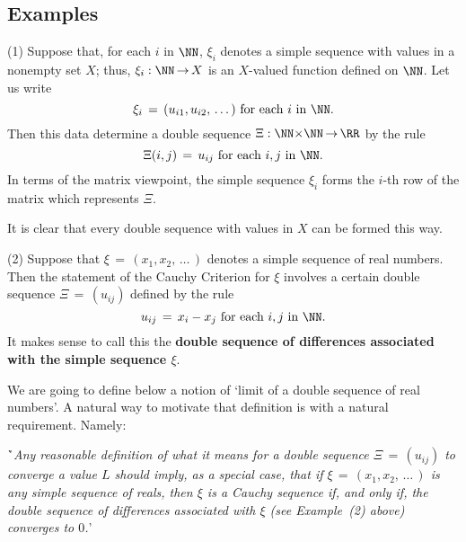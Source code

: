 {\V
\V


            \subsection{\small{\bf Examples}}
            \label{ExampC100.80}

\hspace*{\parindent}
        (1) Suppose that, for each $i$ in ${\NN}$, ${\xi}_{i}$ denotes a simple sequence with values in a nonempty set $X$;
    thus, ${\xi}_{i}:{\NN} \,{\rightarrow}\, X$ is an $X$-valued function defined on ${\NN}$.
    Let us write
        \begin{displaymath}
        {\xi}_{i} \,=\, (u_{i1},u_{i2},\,{\ldots}\,) \mbox{ for each $i$ in ${\NN}$}.
        \end{displaymath}
    Then this data determine a double sequence ${\Xi}:{\NN}{\times}{\NN} \,{\rightarrow}\, {\RR}$ by the rule
        \begin{displaymath}
        {\Xi}(i,j) \,=\, u_{ij} \mbox{ for each $i,j$ in ${\NN}$}.
        \end{displaymath}
    In terms of the matrix viewpoint, the simple sequence ${\xi}_{i}$ forms the $i$-th row of the matrix which represents ${\Xi}$.

        It is clear that every double sequence with values in $X$ can be formed this way.

\V

        (2) Suppose that ${\xi} \,=\, (x_{1},x_{2},\,{\ldots}\,)$ denotes a simple sequence of real numbers.
    Then the statement of the Cauchy Criterion for ${\xi}$ involves a certain double sequence ${\Xi} \,=\, (u_{ij})$ defined by the rule
        \begin{displaymath}
        u_{ij} \,=\, x_{i}-x_{j} \mbox{ for each $i,j$ in ${\NN}$}.
        \end{displaymath}
    It makes sense to call this the {\bf double sequence of differences associated with the simple sequence ${\xi}$}.

\V
\V

        We are going to define below a notion of `limit of a double sequence of real numbers'.
    A natural way to motivate that definition is with a natural requirement. Namely:

\V

        \h `{\em Any reasonable definition of what it means for a double sequence ${\Xi} \,=\, (u_{ij})$ to converge a value $L$ should imply,
    as a special case, that if ${\xi} \,=\, (x_{1},x_{2},\,{\ldots}\,)$ is any simple sequence of reals,
    then ${\xi}$ is a Cauchy sequence if, and only if, the double sequence of differences associated with ${\xi}$ (see Example~(2) above) converges to $0$.}'

}
